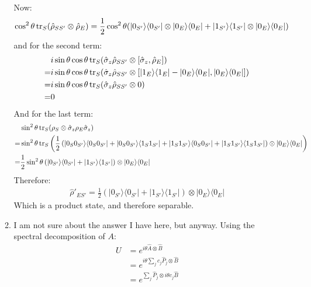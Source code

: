 \documentclass[12pt,a4]{article}
\begin{document}
\begin{enumerate}
\begin{enumerate}
      Now:
      \begin{align*}
        \cos^2 \theta\tr_S( \hat \rho_{SS'} \otimes \hat \rho_E ) = \frac{1}{2}\cos^2 \theta(|0_{S'}\rangle\langle 0_{S'}| \otimes |0_E\rangle\langle 0_E| + |1_{S'}\rangle\langle 1_{S'}| \otimes |0_E\rangle\langle 0_E|)
      \end{align*}
      and for the second term:
      \begin{align*}
          & i \sin \theta \cos \theta \tr_S( \hat\sigma_z \hat \rho_{SS'} \otimes [\hat \sigma_z, \hat \rho_E]) \\
        = & i \sin \theta \cos \theta \tr_S( \hat\sigma_z \hat \rho_{SS'} \otimes [|1_E\rangle\langle1_E| - |0_E\rangle\langle0_E|, |0_E\rangle \langle 0_E|]) \\
        = & i \sin \theta \cos \theta \tr_S( \hat\sigma_z \hat \rho_{SS'} \otimes 0) \\
        = & 0
      \end{align*}
      And for the last term:
      \begin{align*}
          & \sin^2 \theta \tr_S(\rho_S \otimes \hat \sigma_z \rho_E  \hat \sigma_z)\\
        = & \sin^2 \theta \tr_S\left( \frac{1}{2}\left(|0_S0_{S'}\rangle\langle 0_S0_{S'}| + |0_S0_{S'}\rangle\langle 1_S1_{S'}| + |1_S1_{S'}\rangle\langle 0_S0_{S'}| + |1_S1_{S'}\rangle\langle 1_S1_{S'}|\right)\otimes |0_E\rangle \langle 0_E| \right)\\
        = & \frac{1}{2} \sin^2 \theta  \left(|0_{S'}\rangle\langle 0_{S'}| + |1_{S'}\rangle\langle 1_{S'}|\right)\otimes |0_E\rangle \langle 0_E|\\
      \end{align*}
      Therefore:
      \begin{align*}
        \hat \rho'_{ES'} = \frac{1}{2}\left(|0_{S'}\rangle \langle 0_{S'}| + |1_{S'}\rangle \langle 1_{S'}|\right) \otimes |0_E\rangle \langle 0_E|
      \end{align*}
      Which is a product state, and therefore separable.
    \item
      I am not sure about the answer I have here, but anyway.
      Using the spectral decomposition of $A$:
      \begin{align*}
        U &= e^{i \theta \hat A \otimes \hat B}\\
          &= e^{i \theta \sum_j c_j \hat P_j \otimes \hat B}\\
          &= e^{\sum_j \hat P_j \otimes i \theta c_j \hat B}\\

\end{align*}
\end{enumerate}
\end{enumerate}
\end{document}

